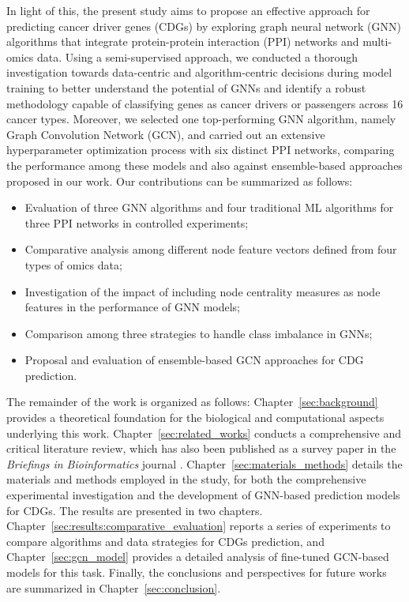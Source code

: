 In light of this, the present study aims to propose an effective approach for predicting cancer driver genes (CDGs) by exploring graph neural network (GNN) algorithms that integrate protein-protein interaction (PPI) networks and multi-omics data. Using a semi-supervised approach, we conducted a thorough investigation towards  data-centric and algorithm-centric decisions during model training to better understand the potential of GNNs and identify a robust methodology capable of classifying genes as cancer drivers or passengers across 16 cancer types. Moreover, we selected one top-performing GNN algorithm, namely Graph Convolution Network (GCN), and carried out an extensive hyperparameter optimization process with six distinct PPI networks, comparing the performance among these models and also against ensemble-based approaches proposed in our work. Our contributions can be summarized as follows:

\begin{itemize}
    \item Evaluation of three GNN algorithms and four traditional ML algorithms for three PPI networks in controlled experiments;
    \item Comparative analysis among different node feature vectors defined from four types of omics data;
    \item Investigation of the impact of including node centrality measures as node features in the performance of GNN models;
    \item Comparison among three strategies to handle class imbalance in GNNs;
    \item Proposal and evaluation of ensemble-based GCN approaches for CDG prediction.
\end{itemize}

The remainder of the work is organized as follows: Chapter~\ref{sec:background} provides a theoretical foundation for the biological and computational aspects underlying this work. Chapter~\ref{sec:related_works} conducts a comprehensive and critical literature review, which has also been published as a survey paper in the \textit{Briefings in Bioinformatics} journal \cite{andrades2022machine}. Chapter~\ref{sec:materials_methods} details the materials and methods employed in the study, for both the comprehensive experimental investigation and the development of GNN-based prediction models for CDGs. The results are presented in two chapters. Chapter~\ref{sec:results:comparative_evaluation} reports a series of experiments to compare algorithms and data strategies for CDGs prediction, and Chapter~\ref{sec:gcn_model} provides a detailed analysis of fine-tuned GCN-based models for this task. Finally, the conclusions and perspectives for future works are summarized in Chapter~\ref{sec:conclusion}.
